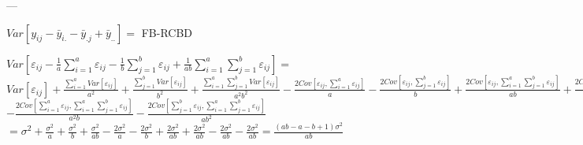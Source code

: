\documentclass[10pt,portrait]{article}
\begin{document}
 ---

$Var[y_{ij}-\bar y_{i.}-\bar y_{.j}+\bar y_{..}]=$
FB-RCBD

$Var[\varepsilon_{ij}-\frac1a\sum_{i=1}^a\varepsilon_{ij}-\frac1b\sum_{j=1}^b\varepsilon_{ij}+\frac1{ab}\sum_{i=1}^a\sum_{j=1}^b\varepsilon_{ij}]=$
$Var[\varepsilon_{ij}]+\frac{\sum_{i=1}^aVar[\varepsilon_{ij}]}{a^2}+\frac{\sum_{j=1}^bVar[\varepsilon_{ij}]}{b^2}+\frac{\sum_{i=1}^a\sum_{j=1}^bVar[\varepsilon_{ij}]}{a^2b^2}-\frac{2Cov[\varepsilon_{ij},\sum_{i=1}^a\varepsilon_{ij}]}{a}-\frac{2Cov[\varepsilon_{ij},\sum_{j=1}^b\varepsilon_{ij}]}{b}+\frac{2Cov[\varepsilon_{ij},\sum_{i=1}^a\sum_{j=1}^b\varepsilon_{ij}]}{ab}+\frac{2Cov[\sum_{i=1}^a\varepsilon_{ij},\sum_{j=1}^b\varepsilon_{ij}]}{ab}$
$-\frac{2Cov[\sum_{i=1}^a\varepsilon_{ij},\sum_{i=1}^a\sum_{j=1}^b\varepsilon_{ij}]}{a^2b}-\frac{2Cov[\sum_{j=1}^b\varepsilon_{ij},\sum_{i=1}^a\sum_{j=1}^b\varepsilon_{ij}]}{ab^2}$
$=\sigma^2+\frac{\sigma^2}{a}+\frac{\sigma^2}{b}+\frac{\sigma^2}{ab}-\frac{2\sigma^2}{a}-\frac{2\sigma^2}{b}+\frac{2\sigma^2}{ab}+\frac{2\sigma^2}{ab}-\frac{2\sigma^2}{ab}-\frac{2\sigma^2}{ab}=\frac{(ab-a-b+1)\sigma^2}{ab}$
\end{document}
